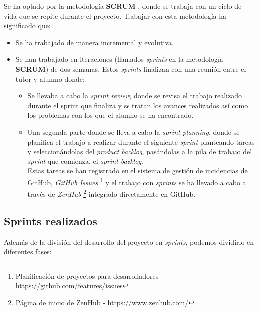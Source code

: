 Se ha optado por la metodología \textbf{SCRUM} \cite{scrum_master_scrum_2019}, donde se trabaja con un ciclo de vida que se repite durante el proyecto. Trabajar con esta metodología ha significado que:
\begin{itemize}
	\item Se ha trabajado de manera incremental y evolutiva.
	\item Se han trabajado en iteraciones (llamados \textit{sprints} en la metodología \textbf{SCRUM}) de dos semanas. Estos \textit{sprints} finalizan con una reunión entre el tutor y alumno donde:
	\begin{itemize}
		\item Se llevaba a cabo la \textit{sprint review}, donde se revisa el trabajo realizado durante el sprint que finaliza y se tratan los avances realizados así como los problemas con los que el alumno se ha encontrado.
				\item Una segunda parte donde se lleva a cabo la \textit{sprint planning}, donde se planifica el trabajo a realizar durante el siguiente \textit{sprint} planteando tareas y seleccionándolas del \textit{product backlog}, pasándolas a la pila de trabajo del \textit{sprint} que comienza, el \textit{sprint backlog}.\\
				Estas tareas se han registrado en el sistema de gestión de incidencias de GitHub, \textit{GitHub Issues} \footnote{Planificación de proyectos para desarrolladores - \url{https://github.com/features/issues}} y el trabajo con \textit{sprints} se ha llevado a cabo a través de \textit{ZenHub} \footnote{Página de inicio de ZenHub - \url{https://www.zenhub.com/}} integrado directamente en GitHub.
	\end{itemize}
\end{itemize}

\subsection{Sprints realizados}

Además de la división del desarrollo del proyecto en \textit{sprints}, podemos dividirlo en diferentes fases:


